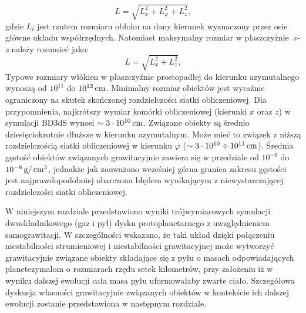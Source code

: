 %
\begin{equation}
   L = \sqrt{L_x^2 + L_\varphi^2 + L_z^2},
\end{equation}
%
gdzie $L_i$ jest rzutem rozmiaru obłoku na dany kierunek wyznaczony przez osie
główne układu współrzędnych. Natomiast maksymalny rozmiar w
płaszczyźnie~\emph{x-z} należy rozumieć jako:
%
\begin{equation}
   L = \sqrt{L_x^2 + L_z^2},
\end{equation}
%
Typowe rozmiary włókien w płaszczyźnie prostopadłej do kierunku azymutalnego
wynoszą od $10^{11}$ do $10^{12}\hbox{$\thinspace\textrm{cm}$}$. Minimalny rozmiar obiektów jest wyraźnie
ograniczony na skutek skończonej rozdzielczości siatki obliczeniowej. Dla
przypomnienia, najkrótszy wymiar komórki obliczeniowej (kierunki $x$ oraz $z$) w
symulacji BD3dS wynosi $\sim 3\cdot10^{10}\hbox{$\thinspace\textrm{cm}$}$. Związane obiekty są średnio
dziesięciokrotnie dłuższe w kierunku azymutalnym. Może mieć to związek z niższą
rozdzielczością siatki obliczeniowej w kierunku $\varphi$ ($\sim 3\cdot10^{10}
\div 10^{11}\hbox{$\thinspace\textrm{cm}$}$). Średnia gęstość
obiektów związanych grawitacyjnie zawiera się w przedziale od $10^{-9}$ do
$10^{-8}\hbox{$\thinspace\textrm{g}$}/\hbox{$\thinspace\textrm{cm}$}^{3}$, jednakże jak zauważono wcześniej górna granica zakresu
gęstości jest najprawdopodobniej obarczona błędem wynikającym z
niewystarczającej rozdzielczości siatki obliczeniowej.
\par W niniejszym rozdziale przedstawiono wyniki trójwymiarowych symulacji
dwuskładnikowego (gaz i pył) dysku protoplanetarnego z uwzględnieniem
samograwitacji. W szczególności wskazano, że taki układ dzięki połączeniu
niestabilności strumieniowej i niestabilności grawitacyjnej może wytworzyć
grawitacyjnie związane obiekty składające się z pyłu o masach odpowiadających
planetezymalom o rozmiarach rzędu setek kilometrów, przy założeniu iż w wyniku
dalszej ewolucji cała masa pyłu uformowałaby zwarte ciało. Szczegółowa dyskusja
własności grawitacyjnie związanych obiektów w kontekście ich dalszej ewolucji
zostanie przedstawiona w następnym rozdziale.
%
